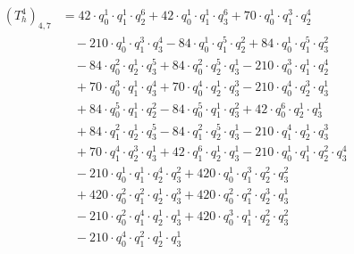 \begin{align*}(T_{h}^4)_{4,7}&=42\cdot q_0^{1}\cdot q_1^{1}\cdot q_2^{6}+42\cdot q_0^{1}\cdot q_1^{1}\cdot q_3^{6}+70\cdot q_0^{1}\cdot q_1^{3}\cdot q_2^{4}\\
&\quad -210\cdot q_0^{1}\cdot q_1^{3}\cdot q_3^{4}-84\cdot q_0^{1}\cdot q_1^{5}\cdot q_2^{2}+84\cdot q_0^{1}\cdot q_1^{5}\cdot q_3^{2}\\
&\quad -84\cdot q_0^{2}\cdot q_2^{1}\cdot q_3^{5}+84\cdot q_0^{2}\cdot q_2^{5}\cdot q_3^{1}-210\cdot q_0^{3}\cdot q_1^{1}\cdot q_2^{4}\\
&\quad +70\cdot q_0^{3}\cdot q_1^{1}\cdot q_3^{4}+70\cdot q_0^{4}\cdot q_2^{1}\cdot q_3^{3}-210\cdot q_0^{4}\cdot q_2^{3}\cdot q_3^{1}\\
&\quad +84\cdot q_0^{5}\cdot q_1^{1}\cdot q_2^{2}-84\cdot q_0^{5}\cdot q_1^{1}\cdot q_3^{2}+42\cdot q_0^{6}\cdot q_2^{1}\cdot q_3^{1}\\
&\quad +84\cdot q_1^{2}\cdot q_2^{1}\cdot q_3^{5}-84\cdot q_1^{2}\cdot q_2^{5}\cdot q_3^{1}-210\cdot q_1^{4}\cdot q_2^{1}\cdot q_3^{3}\\
&\quad +70\cdot q_1^{4}\cdot q_2^{3}\cdot q_3^{1}+42\cdot q_1^{6}\cdot q_2^{1}\cdot q_3^{1}-210\cdot q_0^{1}\cdot q_1^{1}\cdot q_2^{2}\cdot q_3^{4}\\
&\quad -210\cdot q_0^{1}\cdot q_1^{1}\cdot q_2^{4}\cdot q_3^{2}+420\cdot q_0^{1}\cdot q_1^{3}\cdot q_2^{2}\cdot q_3^{2}\\
&\quad +420\cdot q_0^{2}\cdot q_1^{2}\cdot q_2^{1}\cdot q_3^{3}+420\cdot q_0^{2}\cdot q_1^{2}\cdot q_2^{3}\cdot q_3^{1}\\
&\quad -210\cdot q_0^{2}\cdot q_1^{4}\cdot q_2^{1}\cdot q_3^{1}+420\cdot q_0^{3}\cdot q_1^{1}\cdot q_2^{2}\cdot q_3^{2}\\
&\quad -210\cdot q_0^{4}\cdot q_1^{2}\cdot q_2^{1}\cdot q_3^{1}\end{align*}

